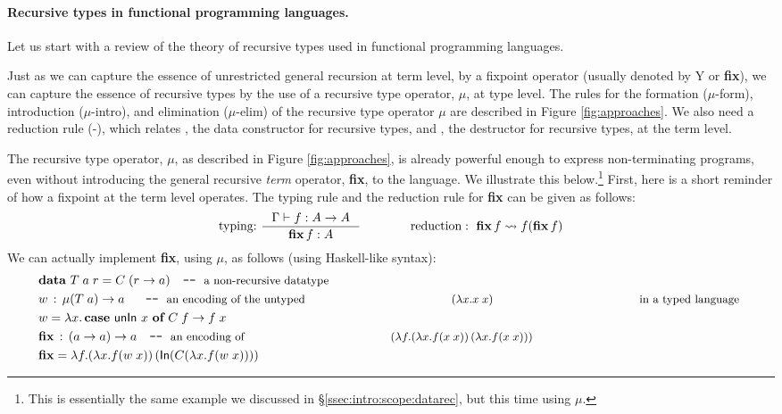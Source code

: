 \paragraph{Recursive types in functional programming languages.}
Let us start with a review of the theory of recursive types used
in functional programming languages.

Just as we can capture the essence of unrestricted general recursion at term
level, by a fixpoint operator (usually denoted by \textsf{Y} or \textbf{fix}),
we can capture the essence of recursive types by the
use of a recursive type operator, $\mu$, at type level. 
The rules for the formation {\small($\mu$-form)},
introduction {\small($\mu$-intro)}, and elimination {\small($\mu$-elim)} of
the recursive type operator $\mu$ are described in Figure \ref{fig:approaches}.
We also need a reduction rule {\small(\unIn-\In)}, which relates \In,
the data constructor for recursive types, and \unIn, the destructor for
recursive types, at the term level.

The recursive type operator, $\mu$, as described in Figure \ref{fig:approaches},
is already powerful enough to express non-terminating programs, even without
introducing the general recursive {\em term} operator, \textbf{fix},
to the language. We illustrate this below.\footnote{This is essentially
        the same example we discussed in \S\ref{ssec:intro:scope:datarec},
        but this time using $\mu$.}
First, here is a short reminder of how a fixpoint at the term level operates.
The typing rule and the reduction rule for \textbf{fix} can be given as follows:
\[ \text{typing:}~ \inference{\Gamma |- f : A -> A}{\textbf{fix}\,f : A}
 \qquad\qquad
   \text{reduction}:~ \textbf{fix}\,f \rightsquigarrow f(\textbf{fix}\,f)
\]
We can actually implement \textbf{fix}, using $\mu$, as follows
(using Haskell-like syntax):
\begin{align*}
& \textbf{data}~T\;a\;r = C\;(r -> a) \quad
          \texttt{-}\texttt{-}~\text{\small a non-recursive datatype} \\
& w \,:\, \mu(T\;a) -> a ~~ \quad
          \texttt{-}\texttt{-}~\text{\small an encoding of the untyped
                                     $(\lambda x.x\;x)$
                                     in a typed language}~ \\
& w = \lambda x . \,\textbf{case}~\mathsf{unIn}~x~\textbf{of}~C\;f -> f\;x \\
& \textbf{fix} \,:\, (a -> a) -> a \quad
          \texttt{-}\texttt{-}~\text{\small an encoding of 
                                     $(\lambda f.(\lambda x.f(x\;x))\,
                                                 (\lambda x.f(x\;x)))$} \\
& \textbf{fix} = \lambda f. (\lambda x. f (w\;x))\,(\mathsf{In}(C(\lambda x. f (w\;x))))
\end{align*}

